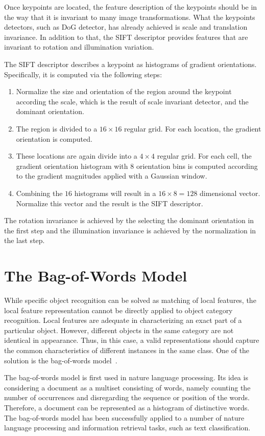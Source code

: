 \documentclass[12pt,final,twoside]{report}
\begin{document}
Once keypoints are located, the feature description of the keypoints should be in the way that it is invariant to many image transformations. What the keypoints detectors, such as DoG detector, has already achieved is scale and translation invariance. In addition to that, the SIFT descriptor provides features that are invariant to rotation and illumination variation.

The SIFT descriptor describes a keypoint as histograms of gradient orientations. Specifically, it is computed via the following steps:
\begin{enumerate}
  \item Normalize the size and orientation of the region around the keypoint according the scale, which is the result of scale invariant detector, and the dominant orientation.
  \item The region is divided to a $16 \times 16$ regular grid. For each location, the gradient orientation is computed.
  \item These locations are again divide into a $4 \times 4$ regular grid. For each cell, the gradient orientation histogram with 8 orientation bins is computed according to the gradient magnitudes applied with a Gaussian window.
  \item Combining the $16$ histograms will result in a $16 \times 8 = 128$ dimensional vector. Normalize this vector and the result is the SIFT descriptor.
\end{enumerate}

The rotation invariance is achieved by the selecting the dominant orientation in the first step and the illumination invariance is achieved by the normalization in the last step.

\section{The Bag-of-Words Model}
While specific object recognition can be solved as matching of local features, the local feature representation cannot be directly applied to object category recognition. Local features are adequate in characterizing an exact part of a particular object. However, different objects in the same category are not identical in appearance. Thus, in this case, a valid representations should capture the common characteristics of different instances in the same class. One of the solution is the bag-of-words model~\cite{csurka_visual_2004}.

The bag-of-words model is first used in nature language processing. Its idea is considering a document as a multiset consisting of words, namely counting the number of occurrences and disregarding the sequence or position of the words. Therefore, a document can be represented as a histogram of distinctive words. The bag-of-words model has been successfully applied to a number of nature language processing and information retrieval tasks, such as text classification.
\end{document}

